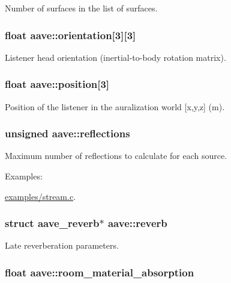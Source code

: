 Number of surfaces in the list of surfaces. \hypertarget{structaave_a1380ca0c5d7610cf1b409043b93b2680}{
\subsubsection[{orientation}]{\setlength{\rightskip}{0pt plus 5cm}float aave\-::orientation\mbox{[}3\mbox{]}\mbox{[}3\mbox{]}}}\label{structaave_a1380ca0c5d7610cf1b409043b93b2680}
Listener head orientation (inertial-\/to-\/body rotation matrix). \hypertarget{structaave_aa592d293dfb41b86d48c0529fd3549d6}{
\subsubsection[{position}]{\setlength{\rightskip}{0pt plus 5cm}float aave\-::position\mbox{[}3\mbox{]}}}\label{structaave_aa592d293dfb41b86d48c0529fd3549d6}
Position of the listener in the auralization world \mbox{[}x,y,z\mbox{]} (m). \hypertarget{structaave_a89d048be9cbd805d11b23d0c8d118eb8}{
\subsubsection[{reflections}]{\setlength{\rightskip}{0pt plus 5cm}unsigned aave\-::reflections}}\label{structaave_a89d048be9cbd805d11b23d0c8d118eb8}
Maximum number of reflections to calculate for each source. \begin{Desc}
\item[Examples\-: ]\par
\hyperlink{examples_2stream_8c-example}{examples/stream.\-c}.\end{Desc}
\hypertarget{structaave_ad2e95c7026a1361aebbd89107903c4be}{
\subsubsection[{reverb}]{\setlength{\rightskip}{0pt plus 5cm}struct {\bf aave\-\_\-reverb}$\ast$ aave\-::reverb}}\label{structaave_ad2e95c7026a1361aebbd89107903c4be}
Late reverberation parameters. \hypertarget{structaave_afe632929215cd44b7344bb4380df1c69}{
\subsubsection[{room\-\_\-material\-\_\-absorption}]{\setlength{\rightskip}{0pt plus 5cm}float aave\-::room\-\_\-material\-\_\-absorption}}\label{structaave_afe632929215cd44b7344bb4380df1c69}
